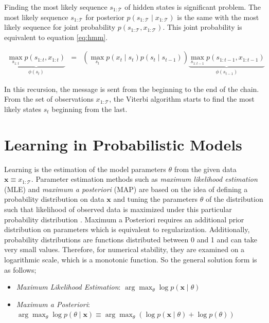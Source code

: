 Finding the most likely sequence $s_{1:\mathcal{T}}$ of hidden states is significant problem\cite{viterbi1967error, forney1973viterbi}. The most likely sequence $s_{1:\mathcal{T}}$ for posterior $p\left(s_{1:\mathcal{T}}\mid x_{1:\mathcal{T}}\right)$ is the same with the most likely sequence for joint probability $p\left(s_{1:\mathcal{T}},x_{1:\mathcal{T}}\right)$. This joint probability is equivalent to equation \ref{eq:hmm}.

\begin{eqnarray}
    \underbrace{\max_{s_{1 : t}} p\left(s_{1 : t}, x_{1 : t}\right)}_{\phi \left(s_{t}\right)} & = & 
    \left(\max_{s_{t}}p\left(x_{t} \mid s_{t}\right) p\left(s_{t} \mid s_{t-1}\right) \right)
    \underbrace{\max _{s_{1 : t-1}} p\left(s_{1 : t-1}, x_{1 : t-1}\right)}_{\phi \left(s_{t-1}\right)}
\end{eqnarray}

In this recursion, the message is sent from the beginning to the end of the chain. 
From the set of observations $x_{1:\mathcal{T}}$, the Viterbi algorithm starts to find the most likely states $s_t$ beginning from the last.

\section{Learning in Probabilistic Models}

Learning is the estimation of the model parameters $\theta$ from the given data $\boldsymbol{x} \equiv x_{1:\mathcal{T}}$. 
Parameter estimation methods such as {\it maximum likelihood estimation} (MLE) and {\it maximum a posteriori} (MAP) are based on the idea of defining a probability distribution on data {$\boldsymbol{x}$} and tuning the parameters $\theta$ of the distribution such that likelihood of observed data is maximized under this particular probability distribution \cite{gauvain1994maximum}.
Maximum a Posteriori requires an additional prior distribution on parameters which is equivalent to regularization. Additionally, probability distributions are functions distributed between 0 and 1 and can take very small values. Therefore, for numerical stability, they are examined on a logarithmic scale, which is a monotonic function. So the general solution form is as follows;

\begin{itemize}
    \item {\it Maximum Likelihood Estimation}: $\arg \max _{\theta} \log p\left(\boldsymbol{x} \mid \theta\right)$
    \item {\it Maximum a Posteriori}: $\arg \max _{\theta} \log p\left(\theta \mid \boldsymbol{x}\right) \equiv \arg \max _{\theta} \left(\log p\left(\boldsymbol{x} \mid \theta\right)+\log p\left(\theta\right)\right)$
\end{itemize}

